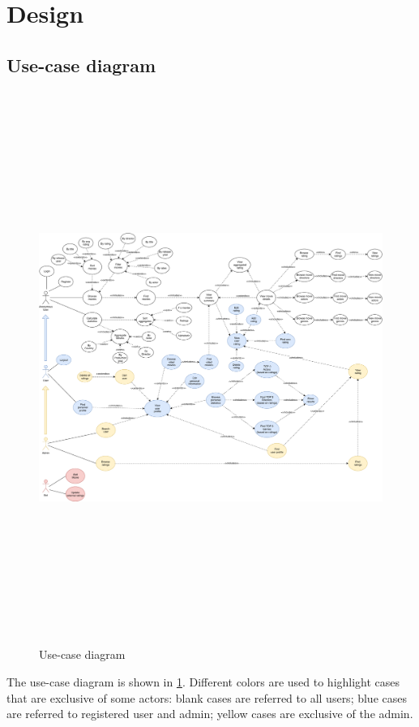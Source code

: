 \documentclass[10pt]{article}
\begin{document}
\section{Design}

\subsection{Use-case diagram}

\begin{figure}
    \centering
    \includegraphics[height=18cm]{figs/use_case.pdf}
    \caption{Use-case diagram}
    \label{fig:usecase}
\end{figure}

The use-case diagram is shown in \cref{fig:usecase}. Different colors are used to highlight cases that are exclusive of some actors: blank cases are referred to all users; blue cases are referred to registered user and admin; yellow cases are exclusive of the admin.
\end{document}
